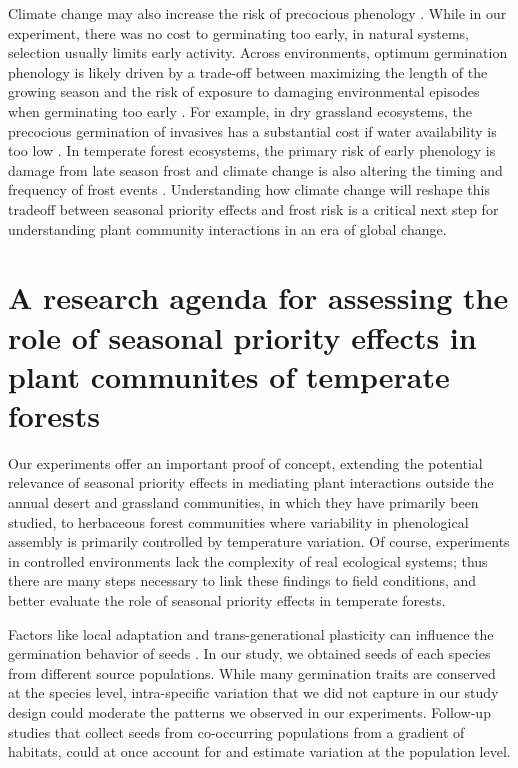 \documentclass{article}[11pt]
\begin{document}
Climate change may also increase the risk of precocious phenology \citep{Inouye:2000ud}. While in our experiment, there was no cost to germinating too early, in natural systems, selection usually limits early activity. Across environments, optimum germination phenology is likely driven by a trade-off between maximizing the length of the growing season and the risk of exposure to damaging environmental episodes when germinating too early \citep{Augspurger:2017vu}. For example, in dry grassland ecosystems, the precocious germination of invasives has a substantial cost if water availability is too low \citep{Wainwright_2011}. In temperate forest ecosystems, the primary risk of early phenology is damage from late season frost \citep{Kollas:2014vn} and climate change is also altering the timing and frequency of frost events \citep{Ma:2019uf}. Understanding how climate change will reshape this tradeoff between seasonal priority effects and frost risk is a critical next step for understanding plant community interactions in an era of global change. 

\section*{A research agenda for assessing the role of seasonal priority effects in plant communites of temperate forests}

Our experiments offer an important proof of concept, extending the potential relevance of seasonal priority effects in mediating plant interactions outside the annual desert and grassland communities, in which they have primarily been studied, to herbaceous forest communities where variability in phenological assembly is primarily controlled by temperature variation. Of course, experiments in controlled environments lack the complexity of real ecological systems; thus there are many steps necessary to link these findings to field conditions, and better evaluate the role of seasonal priority effects in temperate forests.

Factors like local adaptation and trans-generational plasticity can influence the germination behavior of seeds \citep{Donohue:2010uy,Baughman:2019ty}. In our study, we obtained seeds of each species from different source populations. While many germination traits are conserved at the species level, intra-specific variation that we did not capture in our study design could moderate the patterns we observed in our experiments. Follow-up studies that collect seeds from co-occurring populations from a gradient of habitats, could at once account for and estimate variation at the population level. %
\end{document}
